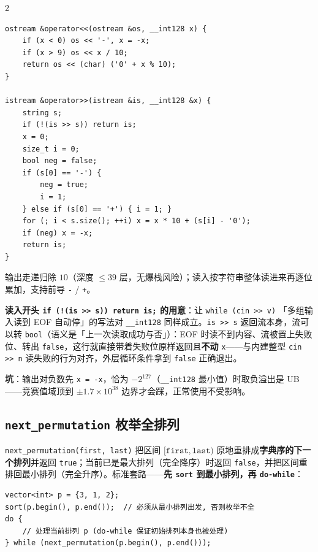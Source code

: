 \begin{multicols*}{2}
		\begin{verbatim}
ostream &operator<<(ostream &os, __int128 x) {
	if (x < 0) os << '-', x = -x;
	if (x > 9) os << x / 10;
	return os << (char) ('0' + x % 10);
}

istream &operator>>(istream &is, __int128 &x) {
	string s;
	if (!(is >> s)) return is;
	x = 0;
	size_t i = 0;
	bool neg = false;
	if (s[0] == '-') {
		neg = true;
		i = 1;
	} else if (s[0] == '+') { i = 1; }
	for (; i < s.size(); ++i) x = x * 10 + (s[i] - '0');
	if (neg) x = -x;
	return is;
}
		\end{verbatim}

		输出走递归除 $10$（深度 $\le 39$ 层，无爆栈风险）；读入按字符串整体读进来再逐位累加，支持前导 \texttt{-} / \texttt{+}。

		\textbf{读入开头 \texttt{if (!(is >> s)) return is;} 的用意}：让 \texttt{while (cin >> v)} 「多组输入读到 EOF 自动停」的写法对 \texttt{\_\_int128} 同样成立。\texttt{is >> s} 返回流本身，流可以转 \texttt{bool}（语义是「上一次读取成功与否」）：EOF 时读不到内容、流被置上失败位、转出 \texttt{false}，这行就直接带着失败位原样返回且\textbf{不动} \texttt{x}——与内建整型 \texttt{cin >> n} 读失败的行为对齐，外层循环条件拿到 \texttt{false} 正确退出。

		\textbf{坑}：输出对负数先 \texttt{x = -x}，恰为 $-2^{127}$（\texttt{\_\_int128} 最小值）时取负溢出是 UB——竞赛值域顶到 $\pm 1.7 \times 10^{38}$ 边界才会踩，正常使用不受影响。

		\subsection{\texttt{next\_permutation} 枚举全排列}

		\texttt{next\_permutation(first, last)} 把区间 $[\texttt{first}, \texttt{last})$ 原地重排成\textbf{字典序的下一个排列}并返回 \texttt{true}；当前已是最大排列（完全降序）时返回 \texttt{false}，并把区间重排回最小排列（完全升序）。标准套路——\textbf{先 \texttt{sort} 到最小排列，再 \texttt{do-while}}：

		\begin{verbatim}
vector<int> p = {3, 1, 2};
sort(p.begin(), p.end());  // 必须从最小排列出发, 否则枚举不全
do {
	// 处理当前排列 p (do-while 保证初始排列本身也被处理)
} while (next_permutation(p.begin(), p.end()));
		\end{verbatim}


\end{multicols*}
